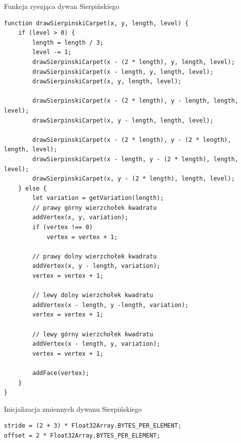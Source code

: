 \documentclass[12pt,a4paper,titlepage]{article}
\begin{document}
\begin{listing}[H]
\caption{Funkcja rysująca dywan Sierpińskiego}
\begin{verbatim}
function drawSierpinskiCarpet(x, y, length, level) {
    if (level > 0) {
        length = length / 3;
        level -= 1;
        drawSierpinskiCarpet(x - (2 * length), y, length, level);
        drawSierpinskiCarpet(x - length, y, length, level);
        drawSierpinskiCarpet(x, y, length, level);

        drawSierpinskiCarpet(x - (2 * length), y - length, length, level);
        drawSierpinskiCarpet(x, y - length, length, level);

        drawSierpinskiCarpet(x - (2 * length), y - (2 * length), length, level);
        drawSierpinskiCarpet(x - length, y - (2 * length), length, level);
        drawSierpinskiCarpet(x, y - (2 * length), length, level);
    } else {
        let variation = getVariation(length);
        // prawy górny wierzchołek kwadratu
        addVertex(x, y, variation);
        if (vertex !== 0)
            vertex = vertex + 1;

        // prawy dolny wierzchołek kwadratu
        addVertex(x, y - length, variation);
        vertex = vertex + 1;

        // lewy dolny wierzchołek kwadratu
        addVertex(x - length, y -length, variation);
        vertex = vertex + 1;

        // lewy górny wierzchołek kwadratu
        addVertex(x - length, y, variation);
        vertex = vertex + 1;

        addFace(vertex);
    }
}
\end{verbatim}
\end{listing}

\begin{listing}[H]
\caption{Inicjalizacja zmiennych dywanu Sierpińskiego}
\begin{verbatim}
stride = (2 + 3) * Float32Array.BYTES_PER_ELEMENT;
offset = 2 * Float32Array.BYTES_PER_ELEMENT;
\end{verbatim}
\end{listing}
\end{document}
